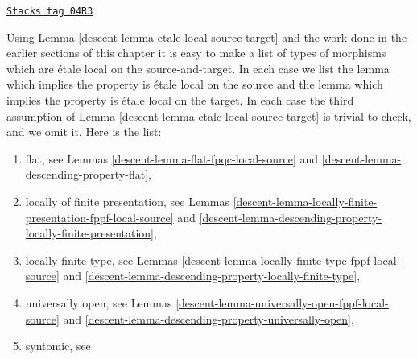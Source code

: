 \begin{remark}
\label{descent-remark-list-local-source-target}
\href{https://stacks.math.columbia.edu/tag/04R3}{\texttt{Stacks tag 04R3}}

Using
Lemma \ref{descent-lemma-etale-local-source-target}
and the work done in the earlier sections of this chapter it is easy
to make a list of types of morphisms which are \'etale local on the
source-and-target. In each case we list the lemma which implies
the property is \'etale local on the source and the lemma which implies
the property is \'etale local on the target. In each case the third assumption
of
Lemma \ref{descent-lemma-etale-local-source-target}
is trivial to check, and we omit it. Here is the list:
\begin{enumerate}
\item flat, see
Lemmas \ref{descent-lemma-flat-fpqc-local-source} and
\ref{descent-lemma-descending-property-flat},
\item locally of finite presentation, see
Lemmas \ref{descent-lemma-locally-finite-presentation-fppf-local-source} and
\ref{descent-lemma-descending-property-locally-finite-presentation},
\item locally finite type, see
Lemmas \ref{descent-lemma-locally-finite-type-fppf-local-source} and
\ref{descent-lemma-descending-property-locally-finite-type},
\item universally open, see
Lemmas \ref{descent-lemma-universally-open-fppf-local-source} and
\ref{descent-lemma-descending-property-universally-open},
\item syntomic, see

\end{enumerate}
\end{remark}
